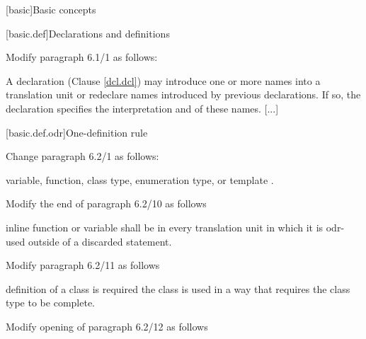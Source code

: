 \setcounter{chapter}{5}
[basic]{Basic concepts}

[basic.def]{Declarations and definitions}

Modify paragraph 6.1/1 as follows:

\begin{std.txt}
  \pnum[1]
  A declaration (Clause \ref{dcl.dcl}) may introduce one or more names into a
  translation unit or redeclare names introduced by previous declarations.
  If so, the declaration specifies the interpretation and
   of these names.
  [...]
  \end{std.txt}

[basic.def.odr]{One-definition rule}

Change paragraph 6.2/1 as follows:
\begin{std.txt}
  \pnum[1]
  variable, function, class type, enumeration type, or template
  .
\end{std.txt}

Modify the end of paragraph 6.2/10 as follows

\begin{std.txt}
\pnum[10]
[...]
inline function or variable shall be  
in every translation unit in which it is odr-used outside of a discarded statement.
\end{std.txt}

Modify paragraph 6.2/11 as follows

\begin{std.txt}
\pnum[11]
 definition of a class is required 
 
the class is used in a way that requires the class type to be complete.
\end{std.txt}

Modify opening of paragraph 6.2/12 as follows

